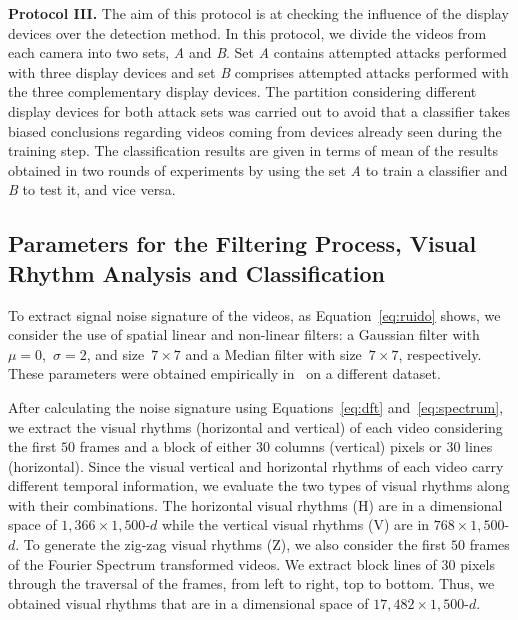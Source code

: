 \documentclass[journal]{IEEEtran}
\begin{document}
{\vspace{0.1cm}
\noindent\textbf{Protocol III.}
The aim of this protocol is at checking the influence of the display devices over the detection method. In this protocol, we divide the videos from each camera into two sets, \emph{A} and \emph{B}. Set \emph{A} contains attempted attacks performed with three display devices and set \emph{B} comprises attempted attacks performed with the three complementary  display devices. The partition considering different display devices for both attack sets was carried out to avoid that a classifier takes biased conclusions regarding videos coming from devices already seen during the training step. The classification results are given in terms of mean of the results obtained in two rounds of experiments by using the set \emph{A} to train a classifier and \emph{B} to test it, and vice versa.
}

\subsection{Parameters for the Filtering Process, Visual Rhythm Analysis and Classification}
{To extract signal noise signature of the videos, as Equation~\ref{eq:ruido} shows}, we consider the use of spatial linear and non-linear filters: a Gaussian filter with~$\mu = 0$,~$\sigma = 2$, and size~$ 7 \times 7$ and a Median filter with size~$7 \times 7$, respectively. These parameters were obtained empirically {in~\cite{Pinto:SIBGRAPI:2012} on a different dataset}.

After calculating the noise signature using Equations~\ref{eq:dft} and~\ref{eq:spectrum}, we extract the visual rhythms {(horizontal and vertical)} of each video considering the first $50$ frames and a block of either $30$ columns (vertical) pixels or $30$ lines (horizontal). Since the visual vertical and horizontal rhythms of each video {carry} different temporal information, we evaluate the two types of visual rhythms along with their combinations. The horizontal visual rhythms {(H)} are in a dimensional space of $1,366 \times 1,500$-$d$ while the vertical visual rhythms {(V)} are in $768 \times 1,500$-$d$. To generate the zig-zag visual rhythms {(Z)}, we {also} consider the first $50$ frames of the Fourier {Spectrum transformed videos}. We extract block lines of $30$ pixels through the traversal of the frames, from left to right, top to bottom. Thus, we obtained visual rhythms that are in a dimensional space of $17,482 \times 1,500$-$d$.
\end{document}
